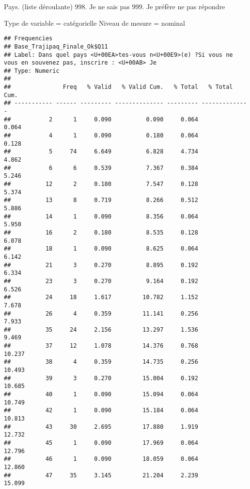 \documentclass[
]{article}
\newenvironment{Shaded}{\begin{snugshade}}{\end{snugshade}}
\newcommand{\FunctionTok}[1]{\textcolor[rgb]{0.00,0.00,0.00}{#1}}
\newcommand{\NormalTok}[1]{#1}
\newcommand{\SpecialCharTok}[1]{\textcolor[rgb]{0.00,0.00,0.00}{#1}}
\begin{document}
Pays. (liste déroulante) 998. Je ne sais pas 999. Je préfère ne pas
répondre

Type de variable = catégorielle Niveau de mesure = nominal

\begin{Shaded}
\end{Shaded}

\begin{verbatim}
## Frequencies  
## Base_Trajipaq_Finale_Ok$Q11  
## Label: Dans quel pays <U+00EA>tes-vous n<U+00E9>(e) ?Si vous ne vous en souvenez pas, inscrire : <U+00AB> Je  
## Type: Numeric  
## 
##               Freq   % Valid   % Valid Cum.   % Total   % Total Cum.
## ----------- ------ --------- -------------- --------- --------------
##           2      1     0.090          0.090     0.064          0.064
##           4      1     0.090          0.180     0.064          0.128
##           5     74     6.649          6.828     4.734          4.862
##           6      6     0.539          7.367     0.384          5.246
##          12      2     0.180          7.547     0.128          5.374
##          13      8     0.719          8.266     0.512          5.886
##          14      1     0.090          8.356     0.064          5.950
##          16      2     0.180          8.535     0.128          6.078
##          18      1     0.090          8.625     0.064          6.142
##          21      3     0.270          8.895     0.192          6.334
##          23      3     0.270          9.164     0.192          6.526
##          24     18     1.617         10.782     1.152          7.678
##          26      4     0.359         11.141     0.256          7.933
##          35     24     2.156         13.297     1.536          9.469
##          37     12     1.078         14.376     0.768         10.237
##          38      4     0.359         14.735     0.256         10.493
##          39      3     0.270         15.004     0.192         10.685
##          40      1     0.090         15.094     0.064         10.749
##          42      1     0.090         15.184     0.064         10.813
##          43     30     2.695         17.880     1.919         12.732
##          45      1     0.090         17.969     0.064         12.796
##          46      1     0.090         18.059     0.064         12.860
##          47     35     3.145         21.204     2.239         15.099

\end{verbatim}
\end{document}

